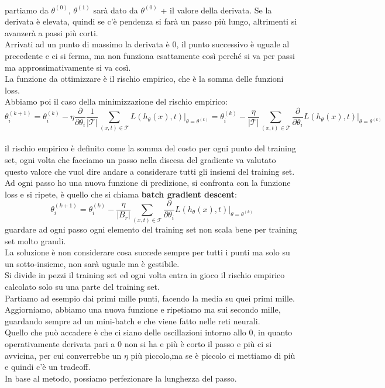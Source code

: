 \documentclass[12pt, oneside]{extbook}
\begin{document}
\\partiamo da $\theta^{(0)}$, $\theta^{(1)}$ sarà dato da $\theta^{(0)}$ + il valore della derivata. Se la derivata è elevata, quindi se c'è pendenza si farà un passo più lungo, altrimenti si avanzerà a passi più corti.\\Arrivati ad un punto di massimo la derivata è 0, il punto successivo è uguale al precedente e ci si ferma, ma non funziona esattamente così perché si va per passi ma approssimativamente si va così.\\La funzione da ottimizzare è il rischio empirico, che è la somma delle funzioni loss.\\Abbiamo poi il caso della minimizzazione del rischio empirico:
\begin{equation}
	\theta_i^{(k+1)} = \theta_i^{(k)} - \eta \frac{\partial}{\partial\theta_i} \frac{1}{|\mathscr{T}|} \sum\limits_{(x,t)\in \mathscr{T}} L(h_{\theta}(x), t)\bigg\rvert_{\theta = \theta^{(k)}} =  
	\theta_i^{(k)} - \frac{\eta}{|\mathscr{T}|} \sum\limits_{(x,t)\in \mathscr{T}} \frac{\partial}{\partial\theta_i} L(h_{\theta}(x), t)\bigg\rvert_{\theta = \theta^{(k)}}
\end{equation}
\\il rischio empirico è definito come la somma del costo per ogni punto del training set, ogni volta che facciamo un passo nella discesa del gradiente va valutato questo valore che vuol dire andare a considerare tutti gli insiemi del training set. Ad ogni passo ho una nuova funzione di predizione, si confronta con la funzione loss e si ripete, è quello che si chiama \textbf{batch gradient descent}: 
\begin{equation}
	\theta_i^{(k+1)} = \theta_i^{(k)} - \frac{\eta}{|B_r|} \sum\limits_{(x,t)\in \mathscr{T}} \frac{\partial}{\partial\theta_i} L(h_{\theta}(x), t)\bigg\rvert_{\theta = \theta^{(k)}}
\end{equation}
guardare ad ogni passo ogni elemento del training set non scala bene per training set molto grandi.\\La soluzione è non considerare cosa succede sempre per tutti i punti ma solo su un sotto-insieme, non sarà uguale ma è gestibile.\\Si divide in pezzi il training set ed ogni volta entra in gioco il rischio empirico calcolato solo su una parte del training set.\\Partiamo ad esempio dai primi mille punti, facendo la media su quei primi mille. Aggiorniamo, abbiamo una nuova funzione e ripetiamo ma sui secondo mille, guardando sempre ad un mini-batch e che viene fatto nelle reti neurali.\\Quello che può accadere è che ci siano delle oscillazioni intorno allo 0, in quanto operativamente derivata pari a 0 non si ha e più è corto il passo e più ci si avvicina, per cui converrebbe un $\eta$ più piccolo,ma se è piccolo ci mettiamo di più e quindi c'è un tradeoff.\\In base al metodo, possiamo perfezionare la lunghezza del passo.
\end{document}
